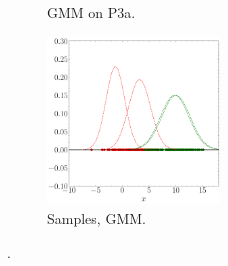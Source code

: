 \documentclass[11pt, a4 paper]{article}
\begin{document}
\begin{figure}[!htbp]
\begin{subfigure}[!htbp]{0.24\textwidth}
       \caption{GMM on P3a.}
       \label{fig:GMM_P3a}
    \end{subfigure}
\quad
    \begin{subfigure}[!htbp]{0.24\textwidth}
       \centering
       \includegraphics[width=1.8in]{../results/ex3/samples_GMM_EM_dataset_P3a_size_199.pdf}
       \caption{Samples, GMM.}
       \label{fig:GMM_DF_P3a}
    \end{subfigure}
\caption{.}
\label{fig:ex3P3a}
\end{figure}
\end{document}
